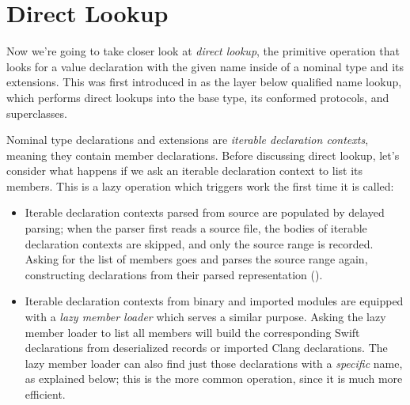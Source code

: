 \documentclass[../generics]{subfiles}
\begin{document}
\section{Direct Lookup}\label{direct lookup}

Now we're going to take closer look at \emph{direct lookup}, the primitive operation that looks for a value declaration with the given name inside of a nominal type and its extensions. This was first introduced in  as the layer below qualified name lookup, which performs direct lookups into the base type, its conformed protocols, and superclasses.

Nominal type declarations and extensions are \emph{iterable declaration contexts}, meaning they contain member declarations. Before discussing direct lookup, let's consider what happens if we ask an iterable declaration context to list its members. This is a lazy operation which triggers work the first time it is called:
\begin{itemize}
\item Iterable declaration contexts parsed from source are populated by delayed parsing; when the parser first reads a source file, the bodies of iterable declaration contexts are skipped, and only the source range is recorded. Asking for the list of members goes and parses the source range again, constructing declarations from their parsed representation ().
\item Iterable declaration contexts from binary and imported modules are equipped with a \emph{lazy member loader} which serves a similar purpose. Asking the lazy member loader to list all members will build the corresponding Swift declarations from deserialized records or imported Clang declarations. The lazy member loader can also find just those declarations with a \emph{specific} name, as explained below; this is the more common operation, since it is much more efficient.
\end{itemize}
\end{document}
